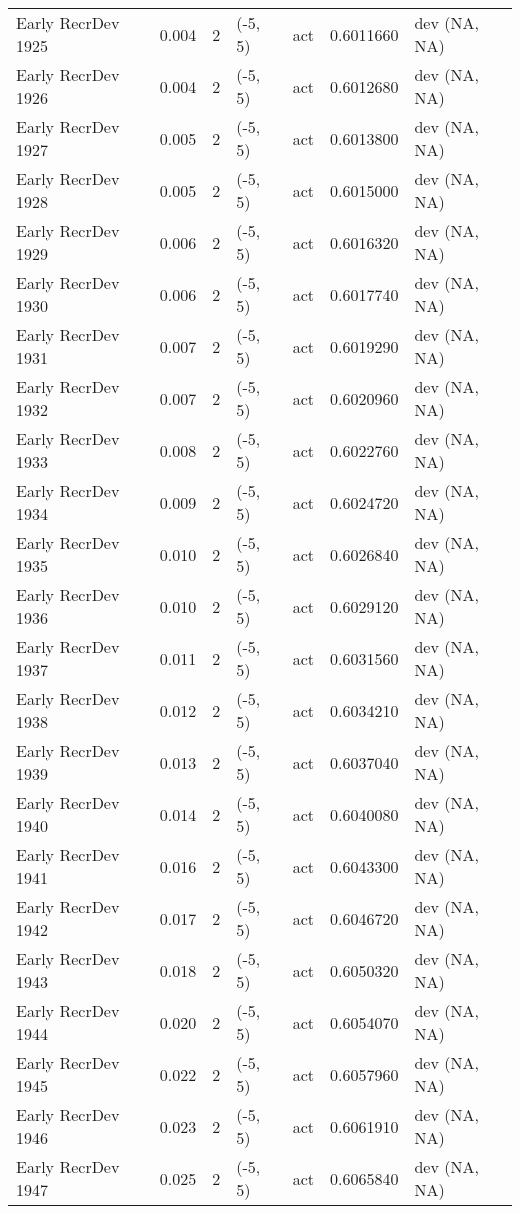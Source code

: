 \documentclass[11pt,
  english,
  letterpaper,
]{article}
\begin{document}
\begin{landscape}
\begin{longtable}[t]{>{\raggedright\arraybackslash}p{7cm}lllll>{\raggedright\arraybackslash}p{4cm}}
Early RecrDev 1925 & 0.004 & 2 & (-5, 5) & act & 0.6011660 & dev (NA, NA)\\
Early RecrDev 1926 & 0.004 & 2 & (-5, 5) & act & 0.6012680 & dev (NA, NA)\\
Early RecrDev 1927 & 0.005 & 2 & (-5, 5) & act & 0.6013800 & dev (NA, NA)\\
Early RecrDev 1928 & 0.005 & 2 & (-5, 5) & act & 0.6015000 & dev (NA, NA)\\
Early RecrDev 1929 & 0.006 & 2 & (-5, 5) & act & 0.6016320 & dev (NA, NA)\\
Early RecrDev 1930 & 0.006 & 2 & (-5, 5) & act & 0.6017740 & dev (NA, NA)\\
Early RecrDev 1931 & 0.007 & 2 & (-5, 5) & act & 0.6019290 & dev (NA, NA)\\
Early RecrDev 1932 & 0.007 & 2 & (-5, 5) & act & 0.6020960 & dev (NA, NA)\\
Early RecrDev 1933 & 0.008 & 2 & (-5, 5) & act & 0.6022760 & dev (NA, NA)\\
Early RecrDev 1934 & 0.009 & 2 & (-5, 5) & act & 0.6024720 & dev (NA, NA)\\
Early RecrDev 1935 & 0.010 & 2 & (-5, 5) & act & 0.6026840 & dev (NA, NA)\\
Early RecrDev 1936 & 0.010 & 2 & (-5, 5) & act & 0.6029120 & dev (NA, NA)\\
Early RecrDev 1937 & 0.011 & 2 & (-5, 5) & act & 0.6031560 & dev (NA, NA)\\
Early RecrDev 1938 & 0.012 & 2 & (-5, 5) & act & 0.6034210 & dev (NA, NA)\\
Early RecrDev 1939 & 0.013 & 2 & (-5, 5) & act & 0.6037040 & dev (NA, NA)\\
Early RecrDev 1940 & 0.014 & 2 & (-5, 5) & act & 0.6040080 & dev (NA, NA)\\
Early RecrDev 1941 & 0.016 & 2 & (-5, 5) & act & 0.6043300 & dev (NA, NA)\\
Early RecrDev 1942 & 0.017 & 2 & (-5, 5) & act & 0.6046720 & dev (NA, NA)\\
Early RecrDev 1943 & 0.018 & 2 & (-5, 5) & act & 0.6050320 & dev (NA, NA)\\
Early RecrDev 1944 & 0.020 & 2 & (-5, 5) & act & 0.6054070 & dev (NA, NA)\\
Early RecrDev 1945 & 0.022 & 2 & (-5, 5) & act & 0.6057960 & dev (NA, NA)\\
Early RecrDev 1946 & 0.023 & 2 & (-5, 5) & act & 0.6061910 & dev (NA, NA)\\
Early RecrDev 1947 & 0.025 & 2 & (-5, 5) & act & 0.6065840 & dev (NA, NA)\\

\end{longtable}
\end{landscape}
\end{document}
